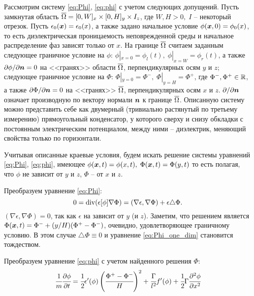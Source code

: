 Рассмотрим систему \eqref{eq:Phi}, \eqref{eq:phi} с учетом следующих допущений. Пусть замкнутая область ${\overline{\Omega}} = [0, W]_x \times [0, H]_y \times I_z$, где $W, H > 0, \; I$ -- некоторый отрезок. Пусть $\epsilon_0({\boldsymbol{x}}) = \epsilon_0(x)$, а также задано начальное условие $\phi({\boldsymbol{x}}, 0) = \phi_0(x)$, то есть диэлектрическая проницаемость неповрежденной среды и начальное распределение фаз зависят только от $x$. На границе ${\overline{\Omega}}$ считаем заданным следующее граничное условие на $\phi$: $\phi|_{x = 0} = \phi_l(t), \; \phi|_{x = W} = \phi_r(t)$, а также $\partial \phi / \partial {\boldsymbol{n}}= 0$ на <<гранях>> области ${\overline{\Omega}}$, перпендикулярных осям $y$ и $z$; следующее граничное условие на $\Phi$: $\Phi|_{y = 0} = \Phi^-, \; \Phi|_{y = H} = \Phi^+$, где $\Phi^-, \Phi^+ \in {\mathbb{R}}$, а также $\partial \Phi / \partial {\boldsymbol{n}} = 0$ на <<гранях>> ${\overline{\Omega}}$, перпендикулярных осям $x$ и $z$. $\partial  / \partial {\boldsymbol{n}}$ означает производную по вектору нормали ${\boldsymbol{n}}$ к границе ${\overline{\Omega}}$. Описанную систему можно представить себе как двумерный (тривиально растянутый по третьему измерению) прямоугольный конденсатор, у которого сверху и снизу обкладки с постоянным электрическим потенциалом, между ними -- диэлектрик, меняющий свойства только по горизонтали.

Учитывая описанные краевые условия, будем искать решение системы уравнений \eqref{eq:Phi}, \eqref{eq:phi}, имеющее $\phi({\boldsymbol{x}}, t) = \phi(x, t), \; \Phi({\boldsymbol{x}}, t) = \Phi(y, t)$ то есть полагая, что $\phi$ не зависит от $y$ и $z$, $\Phi$ -- от $x$ и $z$.

Преобразуем уравнение \eqref{eq:Phi}:
\begin{equation}
	0 = \operatorname{{div}}(\epsilon[\phi] \nabla \Phi) = (\nabla \epsilon, \nabla \Phi) + \epsilon \triangle \Phi {\text{.}}
	\label{eq:Phi_one_dim}
\end{equation}
$(\nabla \epsilon, \nabla \Phi) = 0$, так как $\epsilon$ на зависит от $y$ (и $z$). Заметим, что решением является $\Phi({\boldsymbol{x}}, t) = \Phi^- + (y / H)(\Phi^+ - \Phi^-)$, очевидно, удовлетворяющее граничному условию. В этом случае $\triangle \Phi \equiv 0$ и уравнение \eqref{eq:Phi_one_dim} становится тождеством.

Преобразуем уравнение \eqref{eq:phi} с учетом найденного решения $\Phi$:
\begin{equation}
	\cfrac{1}{m} \cfrac{\partial \phi}{\partial t} = \cfrac{1}{2} \epsilon'(\phi) \left( \cfrac{\Phi^+ - \Phi^-}{H} \right)^2 + \cfrac{\Gamma}{l^2} f'(\phi) + \cfrac{1}{2} \Gamma \cfrac{\partial^2 \phi}{\partial x^2}
	\label{eq:one_dim_preparation}
\end{equation}

